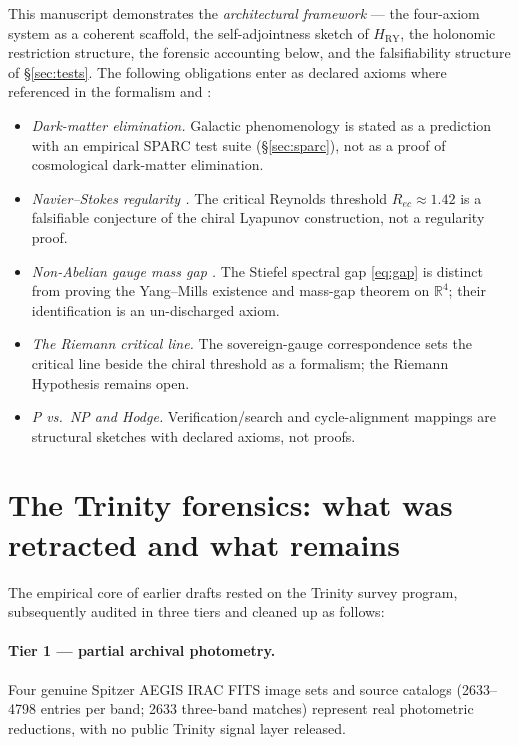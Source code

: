 \documentclass{alienfolio}
\begin{document}
This manuscript demonstrates the \emph{architectural framework} --- the
four-axiom system as a coherent scaffold, the self-adjointness sketch of
$H_{\mathrm{RY}}$, the holonomic restriction structure, the forensic
accounting below, and the falsifiability structure of \S\ref{sec:tests}.
The following obligations enter as declared axioms where referenced in
the formalism and :

\begin{itemize}
\item \emph{Dark-matter elimination.} Galactic phenomenology is stated as
a prediction with an empirical SPARC test suite (\S\ref{sec:sparc}), not
as a proof of cosmological dark-matter elimination.
\item \emph{Navier--Stokes regularity \cite{constantin93}.} The critical
Reynolds threshold $R_{ec} \approx 1.42$ is a falsifiable conjecture of
the chiral Lyapunov construction, not a regularity proof.
\item \emph{Non-Abelian gauge mass gap \cite{jaffe00}.} The Stiefel
spectral gap \eqref{eq:gap} is distinct from proving the Yang--Mills
existence and mass-gap theorem on $\mathbb{R}^4$; their identification is
an un-discharged axiom.
\item \emph{The Riemann critical line.} The sovereign-gauge correspondence
sets the critical line beside the chiral threshold as a formalism; the
Riemann Hypothesis remains open.
\item \emph{P vs.\ NP and Hodge.} Verification/search and cycle-alignment
mappings are structural sketches with declared axioms, not proofs.
\end{itemize}

\section{The Trinity forensics: what was retracted and what remains}
\label{sec:trinity}

The empirical core of earlier drafts rested on the Trinity survey
program, subsequently audited in three tiers and cleaned up as follows:

\paragraph{Tier 1 --- partial archival photometry.} Four genuine Spitzer
AEGIS IRAC FITS image sets and source catalogs (2633--4798 entries per
band; 2633 three-band matches) represent real photometric reductions,
with no public Trinity signal layer released.
\end{document}
